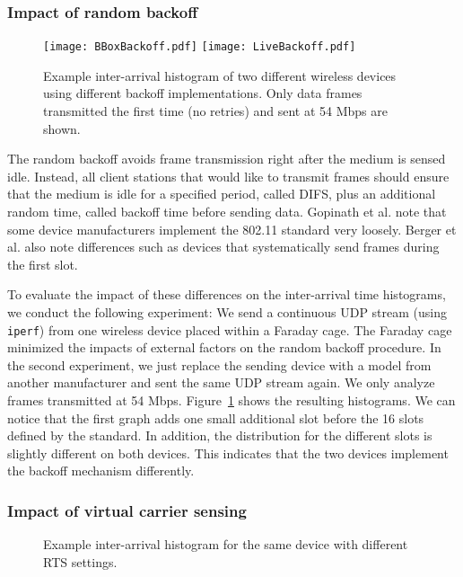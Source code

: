 \documentclass[10pt, conference, compsocconf, letterpaper]{IEEEtran}
\begin{document}
\subsubsection{Impact of random backoff}

\begin{figure}
\begin{center}
\texttt{[image: BBoxBackoff.pdf]}
\texttt{[image: LiveBackoff.pdf]}
\caption{Example inter-arrival histogram of two different wireless devices using different backoff implementations. Only data frames transmitted the first time (no retries) and sent at 54 Mbps are shown.}
\label{fig:backoff}
\end{center}
\end{figure}

The random backoff avoids frame transmission right after the medium is sensed idle. 
Instead, all client stations that would like to transmit frames should ensure that the medium is idle for a specified period, called DIFS, plus an additional random time, called backoff time before sending data.
Gopinath et al. \cite{Gopinath:WiNTECH} note that some device manufacturers implement the 802.11 standard very loosely. Berger et al. \cite{berger-lig2007} also note differences such as devices that systematically send frames during the first slot.

To evaluate the impact of these differences on the inter-arrival time histograms, we conduct the following experiment: 
We send a continuous UDP stream (using {\tt iperf}) from one wireless device placed within a Faraday cage. The Faraday cage minimized the impacts of external factors on the random backoff procedure.
In the second experiment, we just replace the sending device with a model from another manufacturer and sent the same UDP stream again.
We only analyze frames transmitted at 54 Mbps.
Figure~\ref{fig:backoff} shows the resulting histograms. 
We can notice that the first graph adds one small additional slot before the 16 slots defined by the standard. In addition, the distribution for the different slots is slightly different on both devices.
This indicates that the two devices implement the backoff mechanism differently.


\subsubsection{Impact of virtual carrier sensing}

\begin{figure}
\begin{center}
\caption{Example inter-arrival histogram for the same device with different RTS settings.}\label{fig:RTSthreshold_ALL}
\end{center}
\end{figure}
\end{document}
